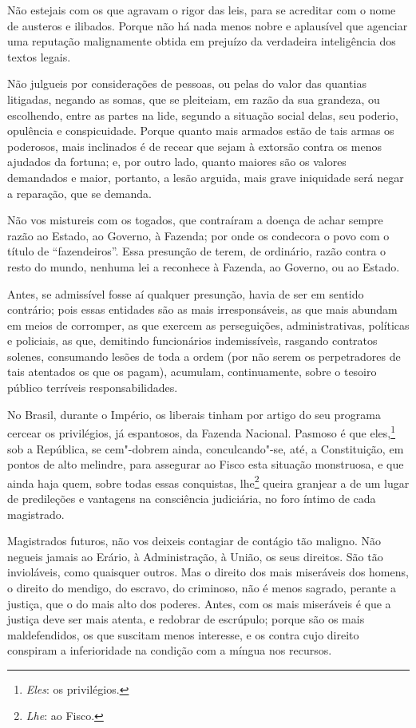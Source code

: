 Não estejais com os que agravam o rigor das leis, para se
acreditar com o nome de austeros e ilibados. Porque não há nada menos
nobre e aplausível que agenciar uma reputação malignamente obtida em
prejuízo da verdadeira inteligência dos textos legais.

Não julgueis por considerações de pessoas, ou pelas do valor das
quantias litigadas, negando as somas, que se pleiteiam, em razão da sua
grandeza, ou escolhendo, entre as partes na lide, segundo a situação
social delas, seu poderio, opulência e conspicuidade. Porque quanto
mais armados estão de tais armas os poderosos, mais inclinados é de
recear que sejam à extorsão contra os menos ajudados da fortuna; e, por
outro lado, quanto maiores são os valores demandados e maior, portanto,
a lesão arguida, mais grave iniquidade será negar a reparação, que se
demanda.

Não vos mistureis com os togados, que contraíram a doença de achar
sempre razão ao Estado, ao Governo, à Fazenda; por onde os condecora o
povo com o título de ``fazendeiros''. Essa
presunção de terem, de ordinário, razão contra o resto do mundo,
nenhuma lei a reconhece à Fazenda, ao Governo, ou ao Estado.

Antes, se admissível fosse aí qualquer presunção, havia de ser em
sentido contrário; pois essas entidades são as mais irresponsáveis, as
que mais abundam em meios de corromper, as que exercem as perseguições,
administrativas, políticas e policiais, as que, demitindo funcionários
indemissíveìs, rasgando contratos solenes, consumando lesões de toda a
ordem (por não serem os perpetradores de tais atentados os que os
pagam), acumulam, continuamente, sobre o tesoiro público terríveis
responsabilidades.

No Brasil, durante o Império, os liberais tinham por artigo do seu
programa cercear os privilégios, já espantosos, da Fazenda Nacional.
Pasmoso é que eles,\footnote{ \textit{Eles}: os privilégios.} sob a República, se cem"-dobrem ainda, conculcando"-se,
até, a Constituição, em pontos de alto melindre, para assegurar ao
Fisco esta situação monstruosa, e que ainda haja quem, sobre todas
essas conquistas, lhe\footnote{ \textit{Lhe}: ao Fisco.} queira granjear a de um lugar de predileções e vantagens na
consciência judiciária, no foro íntimo de cada magistrado.

Magistrados futuros, não vos deixeis contagiar de contágio tão
maligno. Não negueis jamais ao Erário, à Administração, à União, os
seus direitos. São tão invioláveis, como quaisquer outros. Mas o
direito dos mais miseráveis dos homens, o direito do mendigo, do
escravo, do criminoso, não é menos sagrado, perante a justiça, que o do
mais alto dos poderes. Antes, com os mais miseráveis é que a justiça
deve ser mais atenta, e redobrar de escrúpulo; porque são os mais
maldefendidos,
os que suscitam menos interesse, e os contra cujo direito conspiram a
inferioridade na condição com a míngua nos recursos.

